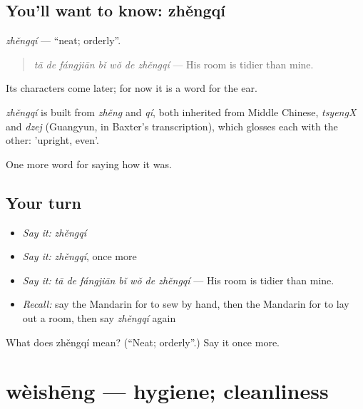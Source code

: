 \subsection*{You'll want to know: zhěngqí}
\emph{zhěngqí} — \textquotedblleft{}neat; orderly\textquotedblright{}.

\begin{quote}
\emph{tā de fángjiān bǐ wǒ de zhěngqí} — His room is tidier than mine.
\end{quote}

Its characters come later; for now it is a word for the ear.

\begin{cousinweb}
\emph{zhěngqí} is built from \emph{zhěng} and \emph{qí}, both inherited from Middle Chinese, \emph{tsyengX} and \emph{dzej} (Guangyun, in Baxter's transcription), which glosses each with the other: 'upright, even'.
\end{cousinweb}

\begin{grammarlens}[title={What you've built}]
One more word for saying how it was.
\end{grammarlens}

\subsection*{Your turn}
\begin{itemize}
\raggedright
  \item \emph{Say it:} \emph{zhěngqí}
  \item \emph{Say it:} \emph{zhěngqí}, once more
  \item \emph{Say it:} \emph{tā de fángjiān bǐ wǒ de zhěngqí} — His room is tidier than mine.
  \item \emph{Recall:} say the Mandarin for to sew by hand, then the Mandarin for to lay out a room, then say \emph{zhěngqí} again
\end{itemize}

\begin{tcolorbox}[breakable,colback=teal!4,colframe=teal!35!black,title={Before you move on}]
What does zhěngqí mean? (\textquotedblleft{}Neat; orderly\textquotedblright{}.) Say it once more.
\end{tcolorbox}
\section[wèishēng]{wèishēng — hygiene; cleanliness}

\label{lesson:ZH-C521-weisheng}



